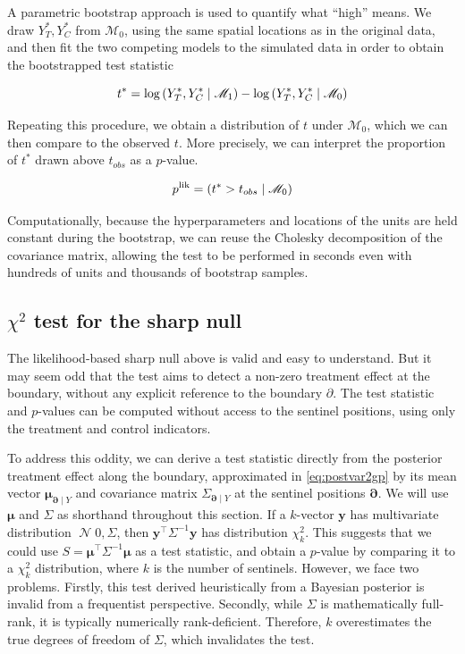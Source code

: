 \documentclass[letter]{article}
\newcommand{\genericdel}[3]{%
      \left#1#3\right#2
    }
\newcommand{\del}[1]{\genericdel(){#1}}
\let\Pr\relax
\DeclareMathOperator{\Pr}{\mathbb{P}}
\DeclareMathOperator{\normal}{\mathcal{N}}
\newcommand{\trans}{^{\intercal}}
\newcommand{\yvec}{\mathbold{y}}
\newcommand{\muvec}{\mathbold{\mu}}
\newcommand{\boundary}{\partial}
\newcommand{\sentinels}{\bm{\boundary}}
\newcommand{\modnull}{\mathscr{M}_0}
\newcommand{\modalt}{\mathscr{M}_1}
\begin{document}
A parametric bootstrap approach is used to quantify what ``high'' means.
We draw \(Y_T^*,Y_C^*\) from \(\modnull\), using the same spatial
locations as in the original data, and then fit the two competing models
to the simulated data in order to obtain the bootstrapped test statistic

\begin{equation}
    t^* = \log \Pr\del{Y_T^*, Y_C^* \mid \modalt} - \log \Pr\del{Y_T^*, Y_C^* \mid \modnull}
\end{equation}

Repeating this procedure, we obtain a distribution of \(t\) under
\(\modnull\), which we can then compare to the observed \(t\). More
precisely, we can interpret the proportion of \(t^*\) drawn above
\(t_{obs}\) as a \(p\)-value.

\begin{equation}
    p^{\mathrm{lik}} = \Pr\del{t^* > t_{obs} \mid \modnull}
\end{equation}

Computationally, because the hyperparameters and locations of the units
are held constant during the bootstrap, we can reuse the Cholesky
decomposition of the covariance matrix, allowing the test to be
performed in seconds even with hundreds of units and thousands of
bootstrap samples.
    


    	\subsection{\texorpdfstring{\(\chi^2\) test for the sharp
null}{\textbackslash{}chi\^{}2 test for the sharp null}}\label{chi2-test-for-the-sharp-null}

The likelihood-based sharp null above is valid and easy to understand.
But it may seem odd that the test aims to detect a non-zero treatment
effect at the boundary, without any explicit reference to the boundary
\(\boundary\). The test statistic and \(p\)-values can be computed
without access to the sentinel positions, using only the treatment and
control indicators.

To address this oddity, we can derive a test statistic directly from the
posterior treatment effect along the boundary, approximated in
\eqref{eq:postvar2gp} by its mean vector \(\muvec_{\sentinels \mid Y}\)
and covariance matrix \(\Sigma_{\sentinels \mid Y}\) at the sentinel
positions \(\sentinels\). We will use \(\muvec\) and \(\Sigma\) as
shorthand throughout this section. If a \(k\)-vector \(\yvec\) has
multivariate distribution \(\normal{0, \Sigma}\), then
\(\yvec\trans \Sigma^{-1} \yvec\) has distribution \(\chi^2_k\). This
suggests that we could use \(S=\muvec\trans \Sigma^{-1} \muvec\) as a
test statistic, and obtain a \(p\)-value by comparing it to a
\(\chi^2_k\) distribution, where \(k\) is the number of sentinels.
However, we face two problems. Firstly, this test derived heuristically
from a Bayesian posterior is invalid from a frequentist perspective.
Secondly, while \(\Sigma\) is mathematically full-rank, it is typically
numerically rank-deficient. Therefore, \(k\) overestimates the true
degrees of freedom of \(\Sigma\), which invalidates the test.
\end{document}
